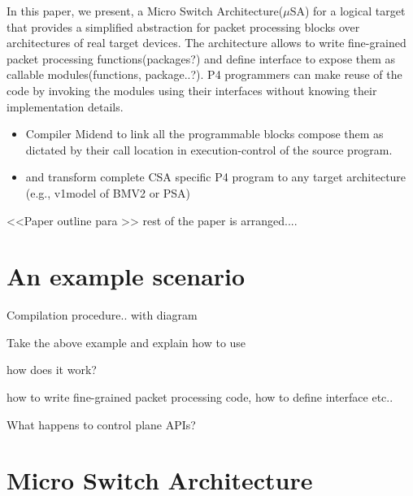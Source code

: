 \documentclass[10pt,sigconf,letterpaper,anonymous]{acmart}
\begin{document}
In this paper, we present, a Micro Switch Architecture($\mu$SA) for a logical target that provides a simplified abstraction for packet processing blocks over architectures of real target devices.
The architecture allows to write fine-grained packet processing functions(packages?) and define interface to expose them as callable modules(functions, package..?).
P4 programmers can make reuse of the code by invoking the modules using their interfaces without knowing their implementation details.
\begin{itemize}
 \item Compiler Midend to link all the programmable blocks compose them as dictated by their call location in execution-control of the source program.
 \item and transform complete CSA specific P4 program to any target architecture (e.g., v1model of BMV2 or PSA)
\end{itemize}

%  
% 
%  
%  
%  

<<Paper outline para  >> rest of the paper is arranged....


\section{An example scenario}





Compilation procedure.. with diagram

Take the above example and explain how to use

how does it work?

how to write fine-grained packet processing code, how to define interface etc..

What happens to control plane APIs?

\section{Micro Switch Architecture}
\end{document}
